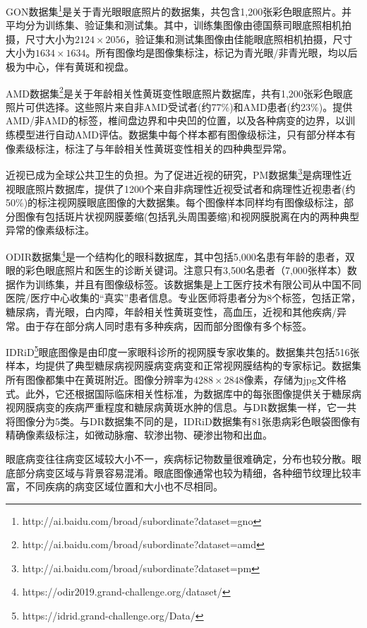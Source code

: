GON数据集\footnote{http://ai.baidu.com/broad/subordinate?dataset=gno}是关于青光眼眼底照片的数据集，共包含1,200张彩色眼底照片。并平均分为训练集、验证集和测试集。其中，训练集图像由德国蔡司眼底照相机拍摄，尺寸大小为$2124\times 2056$，验证集和测试集图像由佳能眼底照相机拍摄，尺寸大小为$1634\times 1634 $。所有图像均是图像集标注，标记为青光眼/非青光眼，均以后极为中心，伴有黄斑和视盘。

AMD数据集\footnote{http://ai.baidu.com/broad/subordinate?dataset=amd}是关于年龄相关性黄斑变性眼底照片数据库，共有1,200张彩色眼底照片可供选择。这些照片来自非AMD受试者(约77\%)和AMD患者(约23\%)。提供AMD/非AMD的标签，椎间盘边界和中央凹的位置，以及各种病变的边界，以训练模型进行自动AMD评估。数据集中每个样本都有图像级标注，只有部分样本有像素级标注，标注了与年龄相关性黄斑变性相关的四种典型异常。

近视已成为全球公共卫生的负担。为了促进近视的研究，PM数据集\footnote{http://ai.baidu.com/broad/subordinate?dataset=pm}是病理性近视眼底照片数据库，提供了1200个来自非病理性近视受试者和病理性近视患者(约50\%)的标注视网膜眼底图像的大数据集。每个图像样本同样均有图像级标注，部分图像有包括斑片状视网膜萎缩(包括乳头周围萎缩)和视网膜脱离在内的两种典型异常的像素级标注。

ODIR数据集\footnote{https://odir2019.grand-challenge.org/dataset/}是一个结构化的眼科数据库，其中包括5,000名患有年龄的患者，双眼的彩色眼底照片和医生的诊断关键词。注意只有3,500名患者（7,000张样本）数据作为训练集，并且有图像级标签。该数据集是上工医疗技术有限公司从中国不同医院/医疗中心收集的“真实”患者信息。专业医师将患者分为8个标签，包括正常，糖尿病，青光眼，白内障，年龄相关性黄斑变性，高血压，近视和其他疾病/异常。由于存在部分病人同时患有多种疾病，因而部分图像有多个标签。

IDRiD\footnote{https://idrid.grand-challenge.org/Data/}眼底图像是由印度一家眼科诊所的视网膜专家收集的。数据集共包括516张样本，均提供了典型糖尿病视网膜病变病变和正常视网膜结构的专家标记。数据集所有图像都集中在黄斑附近。图像分辨率为$4288\times 2848$像素，存储为jpg文件格式。此外，它还根据国际临床相关性标准，为数据库中的每张图像提供关于糖尿病视网膜病变的疾病严重程度和糖尿病黄斑水肿的信息。与DR数据集一样，它一共将图像分为5类。与DR数据集不同的是，IDRiD数据集有81张患病彩色眼袋图像有精确像素级标注，如微动脉瘤、软渗出物、硬渗出物和出血。

眼底病变往往病变区域较大小不一，疾病标记物数量很难确定，分布也较分散。眼底部分病变区域与背景容易混淆。眼底图像通常也较为精细，各种细节纹理比较丰富，不同疾病的病变区域位置和大小也不尽相同。

